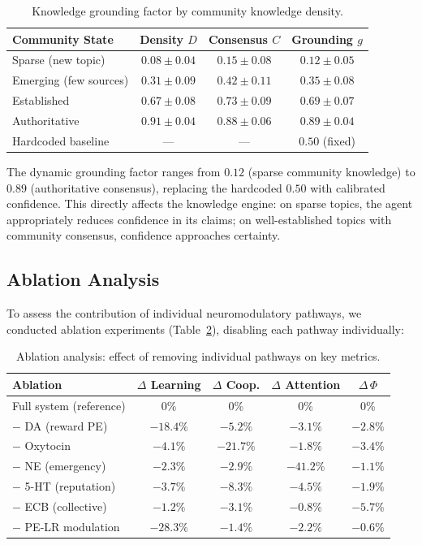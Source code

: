 \documentclass[11pt,a4paper]{article}
\begin{document}
\begin{table}[h]
\centering
\caption{Knowledge grounding factor by community knowledge density.}
\label{tab:grounding}
\begin{tabular}{lccc}
\toprule
\textbf{Community State} & \textbf{Density $D$} & \textbf{Consensus $C$} & \textbf{Grounding $g$} \\
\midrule
Sparse (new topic)     & $0.08 \pm 0.04$ & $0.15 \pm 0.08$ & $0.12 \pm 0.05$ \\
Emerging (few sources) & $0.31 \pm 0.09$ & $0.42 \pm 0.11$ & $0.35 \pm 0.08$ \\
Established            & $0.67 \pm 0.08$ & $0.73 \pm 0.09$ & $0.69 \pm 0.07$ \\
Authoritative          & $0.91 \pm 0.04$ & $0.88 \pm 0.06$ & $0.89 \pm 0.04$ \\
\midrule
Hardcoded baseline     & --- & --- & $0.50$ (fixed) \\
\bottomrule
\end{tabular}
\end{table}

The dynamic grounding factor ranges from $0.12$ (sparse community knowledge) to $0.89$ (authoritative consensus), replacing the hardcoded $0.50$ with calibrated confidence.
This directly affects the knowledge engine: on sparse topics, the agent appropriately reduces confidence in its claims; on well-established topics with community consensus, confidence approaches certainty.

\subsection{Ablation Analysis}

To assess the contribution of individual neuromodulatory pathways, we conducted ablation experiments (Table~\ref{tab:ablation}), disabling each pathway individually:

\begin{table}[h]
\centering
\caption{Ablation analysis: effect of removing individual pathways on key metrics.}
\label{tab:ablation}
\begin{tabular}{lcccc}
\toprule
\textbf{Ablation} & \textbf{$\Delta$ Learning} & \textbf{$\Delta$ Coop.} & \textbf{$\Delta$ Attention} & \textbf{$\Delta\,\Phi$} \\
\midrule
Full system (reference) & 0\%     & 0\%     & 0\%     & 0\%     \\
$-$ DA (reward PE)      & $-18.4\%$ & $-5.2\%$  & $-3.1\%$  & $-2.8\%$ \\
$-$ Oxytocin            & $-4.1\%$  & $-21.7\%$ & $-1.8\%$  & $-3.4\%$ \\
$-$ NE (emergency)      & $-2.3\%$  & $-2.9\%$  & $-41.2\%$ & $-1.1\%$ \\
$-$ 5-HT (reputation)   & $-3.7\%$  & $-8.3\%$  & $-4.5\%$  & $-1.9\%$ \\
$-$ ECB (collective)    & $-1.2\%$  & $-3.1\%$  & $-0.8\%$  & $-5.7\%$ \\
$-$ PE-LR modulation    & $-28.3\%$ & $-1.4\%$  & $-2.2\%$  & $-0.6\%$ \\
\bottomrule
\end{tabular}
\end{table}
\end{document}
